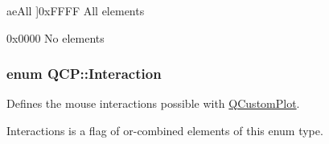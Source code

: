 \begin{Desc}
\begin{description}
{ae\+All\hypertarget{namespace_q_c_p_ae55dbe315d41fe80f29ba88100843a0caa897c232a0ffc8368e7c100ffc59ef31}{}\label{namespace_q_c_p_ae55dbe315d41fe80f29ba88100843a0caa897c232a0ffc8368e7c100ffc59ef31}
}]{\ttfamily 0x\+F\+F\+FF} All elements \item[{\em 
ae\+None\hypertarget{namespace_q_c_p_ae55dbe315d41fe80f29ba88100843a0caa9e90d81896358757d94275aeaa58f6a}{}\label{namespace_q_c_p_ae55dbe315d41fe80f29ba88100843a0caa9e90d81896358757d94275aeaa58f6a}
}]{\ttfamily 0x0000} No elements \end{description}
\end{Desc}
\subsubsection[{\texorpdfstring{Interaction}{Interaction}}]{\setlength{\rightskip}{0pt plus 5cm}enum {\bf Q\+C\+P\+::\+Interaction}}\hypertarget{namespace_q_c_p_a2ad6bb6281c7c2d593d4277b44c2b037}{}\label{namespace_q_c_p_a2ad6bb6281c7c2d593d4277b44c2b037}
Defines the mouse interactions possible with \hyperlink{class_q_custom_plot}{Q\+Custom\+Plot}.

{\ttfamily Interactions} is a flag of or-\/combined elements of this enum type.

